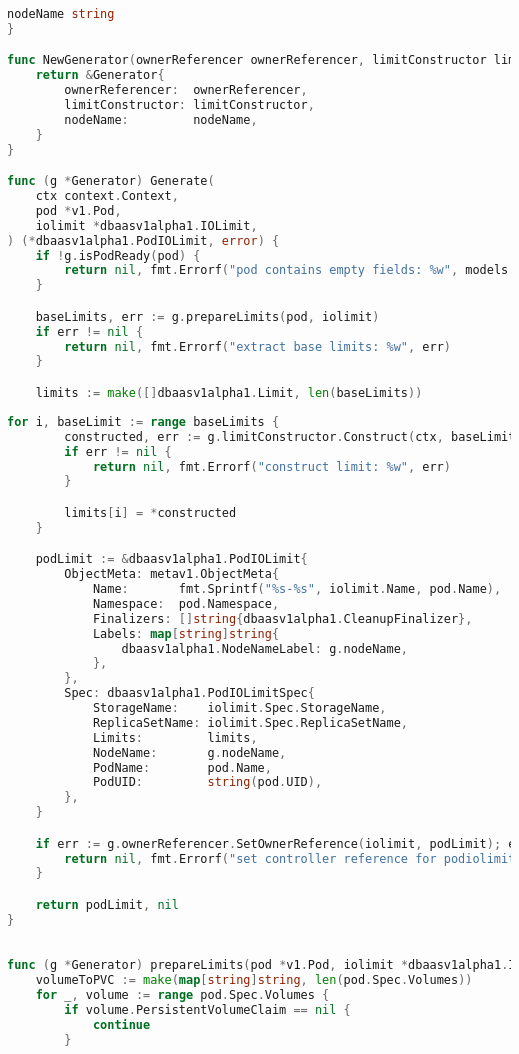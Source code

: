 \begin{appendices}
\begin{lstlisting}[language=Go,label=lst:podiolimit_gen1, caption={Генерация PodIOLimit}]
	nodeName string
}

func NewGenerator(ownerReferencer ownerReferencer, limitConstructor limitConstructor, nodeName string) *Generator {
	return &Generator{
		ownerReferencer:  ownerReferencer,
		limitConstructor: limitConstructor,
		nodeName:         nodeName,
	}
}

func (g *Generator) Generate(
	ctx context.Context,
	pod *v1.Pod,
	iolimit *dbaasv1alpha1.IOLimit,
) (*dbaasv1alpha1.PodIOLimit, error) {
	if !g.isPodReady(pod) {
		return nil, fmt.Errorf("pod contains empty fields: %w", models.ErrPodIsNotReady)
	}

	baseLimits, err := g.prepareLimits(pod, iolimit)
	if err != nil {
		return nil, fmt.Errorf("extract base limits: %w", err)
	}

	limits := make([]dbaasv1alpha1.Limit, len(baseLimits))
\end{lstlisting}

\begin{lstlisting}[language=Go,label=lst:podiolimit_gen2, caption={Генерация PodIOLimit (продолжение листинга~\ref{lst:podiolimit_gen1})}]
	for i, baseLimit := range baseLimits {
		constructed, err := g.limitConstructor.Construct(ctx, baseLimit)
		if err != nil {
			return nil, fmt.Errorf("construct limit: %w", err)
		}

		limits[i] = *constructed
	}

	podLimit := &dbaasv1alpha1.PodIOLimit{
		ObjectMeta: metav1.ObjectMeta{
			Name:       fmt.Sprintf("%s-%s", iolimit.Name, pod.Name),
			Namespace:  pod.Namespace,
			Finalizers: []string{dbaasv1alpha1.CleanupFinalizer},
			Labels: map[string]string{
				dbaasv1alpha1.NodeNameLabel: g.nodeName,
			},
		},
		Spec: dbaasv1alpha1.PodIOLimitSpec{
			StorageName:    iolimit.Spec.StorageName,
			ReplicaSetName: iolimit.Spec.ReplicaSetName,
			Limits:         limits,
			NodeName:       g.nodeName,
			PodName:        pod.Name,
			PodUID:         string(pod.UID),
		},
	}

	if err := g.ownerReferencer.SetOwnerReference(iolimit, podLimit); err != nil {
		return nil, fmt.Errorf("set controller reference for podiolimit from iolimit: %w", err)
	}

	return podLimit, nil
}
\end{lstlisting}

\begin{lstlisting}[language=Go,label=lst:podiolimit_gen3, caption={Генерация PodIOLimit (продолжение листинга~\ref{lst:podiolimit_gen2})}]

func (g *Generator) prepareLimits(pod *v1.Pod, iolimit *dbaasv1alpha1.IOLimit) ([]models.LimitBase, error) {
	volumeToPVC := make(map[string]string, len(pod.Spec.Volumes))
	for _, volume := range pod.Spec.Volumes {
		if volume.PersistentVolumeClaim == nil {
			continue
		}


\end{lstlisting}
\end{appendices}
